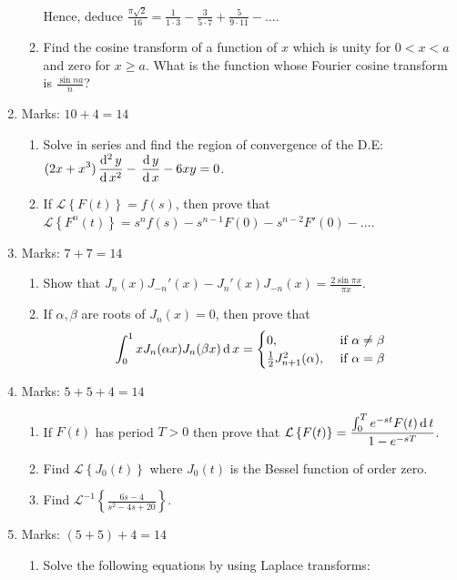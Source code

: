 \documentclass[../main-sheet.tex]{subfiles}
\newcommand{\lap}[1]{\mathcal{L}\left\{ #1\right\}}
\newcommand{\ilap}[1]{\mathcal{L}^{-1}\left\{ #1\right\}}
\begin{document}
\begin{enumerate}
\begin{enumerate}
        Hence, deduce $ \displaystyle \frac{\pi\sqrt{2}}{16}=\frac{1}{1\cdot 3}-\frac{3}{5\cdot 7}+\frac{5}{9\cdot 11}-\dots $.
        \item Find the cosine transform of a function of $ x $ which is unity for $ 0<x<a $ and zero for $ x\geq a $. What is the function whose Fourier cosine transform is $ \displaystyle\frac{\sin na}{n} $?
    \end{enumerate}
    \item Marks: $ 10+4=14 $
    \begin{enumerate}
        \item Solve in series and find the region of convergence of the D.E: $\displaystyle (2x+x^3)\,\frac{\mathrm{d}^{2}\, y}{\mathrm{d}\, x^{2}}-\,\frac{\mathrm{d}\,y}{\mathrm{d}\,x}-6xy=0 $.
        \item If $ \lap{F(t)}=f(s) $, then prove that $\displaystyle \lap{F^{n}(t)}=s^nf(s)-s^{n-1}F(0)-s^{n-2}F'(0)-\dots $.
    \end{enumerate}
    \item Marks: $ 7+7=14 $
    \begin{enumerate}
        \item Show that $\displaystyle J_n(x)J_{-n}'(x)-J_n'(x)J_{-n}(x)=\frac{2\sin \pi x}{\pi x} $.
        \item If $ \alpha, \beta $ are roots of $ J_n(x)=0 $, then prove that \[\int_0^1xJ_n(\alpha x)J_n(\beta x)\,\mathrm{d}\, x =\begin{cases}
            0, &\text{ if }\alpha\neq \beta\\
            \frac{1}{2}J_{n+1}^2(\alpha), &\text{ if }\alpha= \beta
        \end{cases}\]
    \end{enumerate}
    \item Marks: $ 5+5+4=14 $
    \begin{enumerate}
        \item If $ F(t) $ has period $ T>0 $ then prove that $ \displaystyle \lap{F(t)}=\frac{\int_0^Te^{-st}F(t)\D t}{1-e^{-sT}} $.
        \item Find $ \lap{J_0(t)}$ where $ J_0(t) $ is the Bessel function of order zero.
        \item Find $\displaystyle \ilap{\frac{6s-4}{s^2-4s+20}} $.
    \end{enumerate}
    \item Marks: $ (5+5)+4=14 $
    \begin{enumerate}
        \item Solve the following equations by using Laplace transforms:
        \begin{enumerate}[label=(\roman*)]

\end{enumerate}
\end{enumerate}
\end{enumerate}
\end{document}
